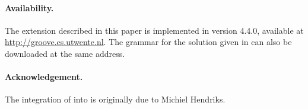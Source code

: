 \paragraph{Availability.}
The \Prolog extension described in this paper is implemented in \GROOVE version
4.4.0, available at \url{http://groove.cs.utwente.nl}. The grammar for the
solution given in  can also be downloaded at the same address.

\paragraph{Acknowledgement.} The integration of \Prolog into
\GROOVE is originally due to Michiel Hendriks.
%
%